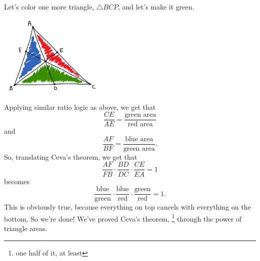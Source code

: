 \documentclass{article}
\begin{document}
Let's color one more triangle, $\triangle BCP$, and let's make it green.
\begin{center}
    \centering
    \includegraphics[width=2in]{images/triangle_areas/part_2/ceva_fig2.png}
\end{center}
Applying similar ratio logic as above, we get that
\[\frac{CE}{AE} = \frac{\text{green area}}{\text{red area}}\]
and 
\[\frac{AF}{BF} = \frac{\text{blue area}}{\text{green area}}.\]
So, translating Ceva's theorem, we get that
\[ \dfrac{AF}{FB} \cdot \dfrac{BD}{DC} \cdot \dfrac{CE}{EA} = 1\]
becomes
\[ \frac{\text{blue}}{\text{green}} \cdot \frac{\text{blue}}{\text{red}} \cdot \frac{\text{green}}{\text{red}} = 1. \]
This is obviously true, because everything on top cancels with everything on the bottom. So we're done! We've proved Ceva's theorem, \footnote{one half of it, at least} through the power of triangle areas.
\end{document}
